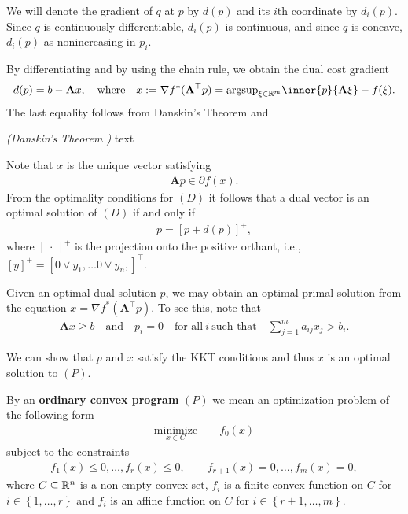 \begin{theorem}
  \emph{\cite[Theorem~26.3]{Rockafellar1970}}
\end{theorem}

We will denote the gradient of $q$ at $p$ by $d(p)$
and its $i$th coordinate by $d_i(p).$
Since $q$ is continuously differentiable, $d_i(p)$ is continuous, 
and since $q$ is concave, 
$d_i(p)$ as nonincreasing in $p_i.$

By differentiating and by using the chain rule, 
we obtain the dual cost gradient
\begin{gather}
  d(p)=b-\mathbf{A}x,
  \quad
  \text{where}
  \quad
  x:=
  \nabla
  f^*
  (
    \mathbf{A}^\top
    p
  )
  =
  \mathrm{argsup}
  _{\xi \in \R^m}
  \inner{p}{\mathbf{A}\xi}
  - f(\xi)
  .
\end{gather}
The last equality follows from Danskin's Theorem and \cite[Theorem~23.5]{Rockafellar1970}
\begin{proposition}
  \emph{(Danskin's Theorem \cite[page 649]{Bertsekas2003})}
  text
\end{proposition}

Note that $x$ is the unique vector satisfying 
\begin{gather}
  \mathbf{A}p
  \in 
  \partial
  f(x)
  .
\end{gather}
From the optimality conditions for $(D)$ it follows that 
a dual vector is an optimal solution of $(D)$
if and only if 
\begin{gather}
  p
  =
  [p + d(p)]^+
  ,
\end{gather}
where $[\ \cdot \ ]^+$ is the projection onto the positive orthant, i.e.,
$
  [y]^+
  =
  [
    0 \lor y_1,
    \ldots
    0 \lor y_n,
  ]
  ^\top
  .
$

Given an optimal dual solution $p$,
we may obtain an optimal primal solution from the equation 
$
  x=
  \nabla
  f^*
  (
    \mathbf{A}^\top
    p
  )
.
$
To see this, 
note that 
 \begin{gather}
   \mathbf{A}x \ge b
   \quad
   \text{and}
   \quad
   p_i 
   =
   0
   \quad 
   \text{for all}
   \ 
   i
   \ 
   \text{such that}
   \quad 
   \sum_{j=1}^{m} 
   a_{ij}
   x_j
   >
   b_i
   .
 \end{gather}

 We can show that $p$ and $x$ satisfy the KKT conditions and thus $x$ is an optimal solution to $(P)$.


\begin{definition}
  \emph{\cite[§28]{Rockafellar1970}}
  By an \textbf{ordinary convex program}
  $(P)$
  we mean an optimization problem of the following form
  \begin{gather*}
    \underset{x\in C}{\mathrm{minimize}}
    \qquad
    f_0(x)
  \end{gather*}
subject to the constraints
\begin{gather}
  f_1(x)\le 0,
  \ldots,
  f_r(x)\le 0,
  \qquad
  f_{r+1}(x)= 0,
  \ldots,
  f_m(x)= 0,
\end{gather}
where $C\subseteq \mathbb{R}^n$
is a non-empty convex set,
$f_i$ is a finite convex function on $C$ for $i\in \left\{ 1,\ldots,r \right\}$
 and 
 $f_i$ is an affine function on $C$ for $i\in \left\{ r+1, \ldots, m \right\}.$
\end{definition}

